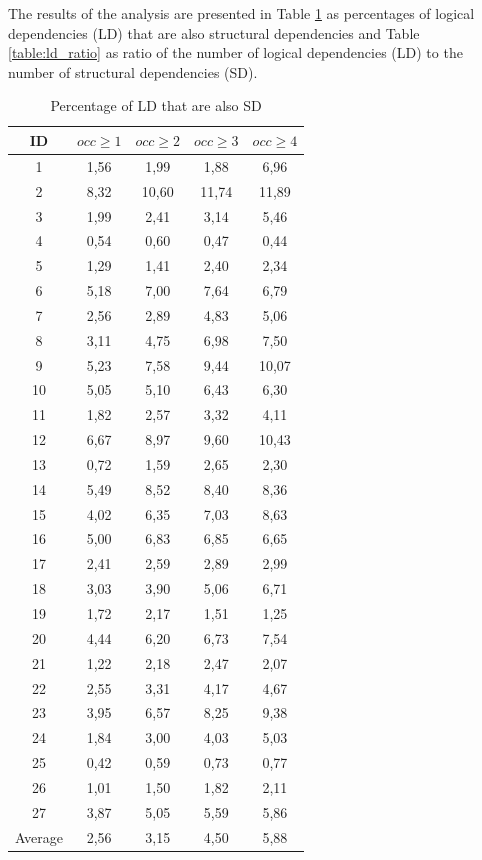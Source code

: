\documentclass[conference]{IEEEtran}
\begin{document}
The results of the analysis are presented in Table \ref{table:sd_percentages} as percentages of logical dependencies (LD) that are also structural dependencies and Table \ref{table:ld_ratio} as ratio of the number of logical dependencies (LD) to the number of structural dependencies (SD).



\begin{table}[!h]
\renewcommand{\arraystretch}{1.25}
\caption{Percentage of LD that are also SD}
\label{table:sd_percentages}
\centering
\begin{tabular}{|c|c|c|c|c|}
\hline
    ID  & $occ\geq 1$ & $occ\geq 2$ & $occ\geq 3$ & $occ\geq 4$  \\
\hline
1	&	1,56	&	1,99	&	1,88	&	6,96	\\
2	&	8,32	&	10,60	&	11,74	&	11,89	\\
3	&	1,99	&	2,41	&	3,14	&	5,46	\\
4	&	0,54	&	0,60	&	0,47	&	0,44	\\
5	&	1,29	&	1,41	&	2,40	&	2,34	\\
6	&	5,18	&	7,00	&	7,64	&	6,79	\\
7	&	2,56	&	2,89	&	4,83	&	5,06	\\
8	&	3,11	&	4,75	&	6,98	&	7,50	\\
9	&	5,23	&	7,58	&	9,44	&	10,07	\\
10	&	5,05	&	5,10	&	6,43	&	6,30	\\
11	&	1,82	&	2,57	&	3,32	&	4,11	\\
12	&	6,67	&	8,97	&	9,60	&	10,43	\\
13	&	0,72	&	1,59	&	2,65	&	2,30	\\
14	&	5,49	&	8,52	&	8,40	&	8,36	\\
15	&	4,02	&	6,35	&	7,03	&	8,63	\\
16	&	5,00	&	6,83	&	6,85	&	6,65	\\
17	&	2,41	&	2,59	&	2,89	&	2,99	\\
18	&	3,03	&	3,90	&	5,06	&	6,71	\\
19	&	1,72	&	2,17	&	1,51	&	1,25	\\
20	&	4,44	&	6,20	&	6,73	&	7,54	\\
21	&	1,22	&	2,18	&	2,47	&	2,07	\\
22	&	2,55	&	3,31	&	4,17	&	4,67	\\
23	&	3,95	&	6,57	&	8,25	&	9,38	\\
24	&	1,84	&	3,00	&	4,03	&	5,03	\\
25	&	0,42	&	0,59	&	0,73	&	0,77	\\
26	&	1,01	&	1,50	&	1,82	&	2,11	\\
27	&	3,87	&	5,05	&	5,59	&	5,86	\\

\hline
Average	&	2,56	&	3,15	&	4,50	&	5,88	\\


\hline
\end{tabular}
\end{table}
\end{document}
